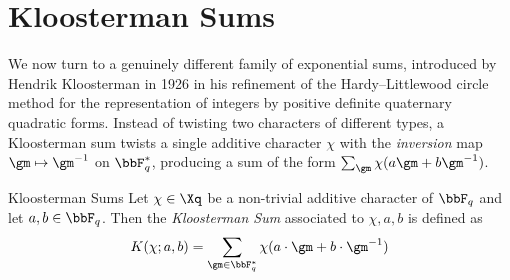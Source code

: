 \section{Kloosterman Sums}
We now turn to a genuinely different family of exponential sums, introduced by Hendrik Kloosterman in 1926 in his refinement of the Hardy--Littlewood circle method for the representation of integers by positive definite quaternary quadratic forms. Instead of twisting two characters of different types, a Kloosterman sum twists a single additive character $\chi$ with the \emph{inversion} map $\gm\mapsto \gm^{-1}$ on $\bbF_q^*$, producing a sum of the form $\sum_{\gm}\chi(a\gm+b\gm^{-1})$.

\begin{Definition}{Kloosterman Sums}{}
  Let $\chi\in\Xq$ be a non-trivial additive character of $\bbF_q$ and let $a,b\in\bbF_q$. Then the \emph{Kloosterman Sum} associated to $\chi,a,b$ is defined as $$K(\chi;a,b)=\sum_{\gm\in\bbF_q^*}\chi(a\cdot \gm+b\cdot \gm^{-1})$$
\end{Definition}